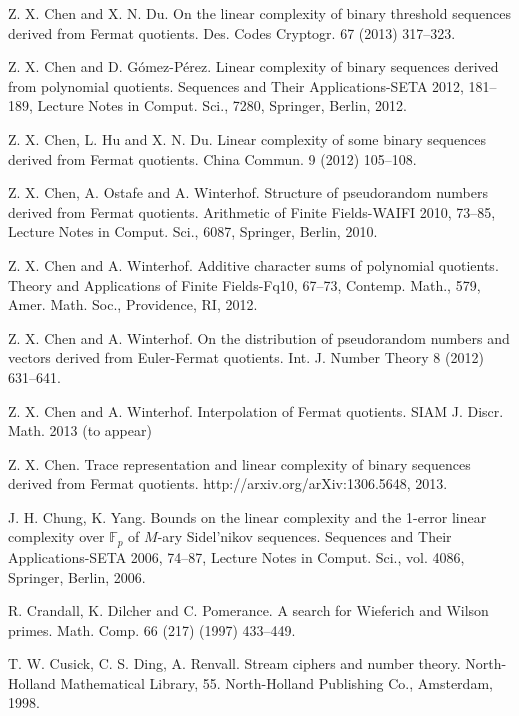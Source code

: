 \documentclass [11pt,a4paper]{article}
\def\F{\mathbb{F}}
\begin{document}
\begin{thebibliography}{99}
  Z. X. Chen  and  X. N. Du. On the linear complexity of binary threshold sequences derived from
Fermat quotients. Des. Codes Cryptogr. 67 (2013) 317--323.



Z. X. Chen  and  D. G\'{o}mez-P\'{e}rez. Linear complexity of
binary sequences derived from polynomial quotients. Sequences and Their Applications-SETA 2012, 181--189, Lecture Notes in Comput. Sci., 7280, Springer, Berlin, 2012.

  Z. X. Chen, L. Hu  and  X. N. Du. Linear complexity of some binary sequences derived from Fermat
quotients. China Commun.  9 (2012) 105--108.


  Z. X. Chen, A. Ostafe and  A. Winterhof. Structure of
pseudorandom numbers derived from Fermat quotients. Arithmetic of Finite Fields-WAIFI 2010, 73--85, Lecture Notes in Comput. Sci., 6087, Springer, Berlin, 2010.




Z. X. Chen  and A.  Winterhof. Additive character sums of
polynomial quotients. Theory and Applications of Finite Fields-Fq10,
67--73, Contemp. Math., 579, Amer. Math. Soc., Providence, RI, 2012.

Z. X. Chen  and A.  Winterhof. On the distribution of pseudorandom
numbers and vectors derived from Euler-Fermat quotients. Int. J.
Number Theory 8 (2012) 631--641.

 Z. X. Chen and A. Winterhof. Interpolation of Fermat quotients. SIAM J. Discr. Math. 2013 (to appear)



 Z. X. Chen. Trace representation and linear complexity of binary
sequences derived from Fermat quotients.  http://arxiv.org/arXiv:1306.5648, 2013.



J. H. Chung, K. Yang. Bounds on the linear complexity and the 1-error linear complexity over $\F_p$ of $M$-ary Sidel'nikov sequences. Sequences and Their Applications-SETA 2006, 74--87, Lecture Notes in Comput. Sci., vol. 4086, Springer, Berlin, 2006.

  R. Crandall, K. Dilcher and C. Pomerance. A search for Wieferich
and Wilson primes. Math. Comp. 66 (217) (1997) 433--449.

T. W. Cusick, C. S. Ding, A. Renvall. Stream ciphers and number theory.
North-Holland Mathematical Library, 55. North-Holland Publishing
Co., Amsterdam, 1998.


\end{thebibliography}
\end{document}
